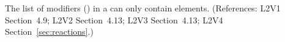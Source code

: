 The list of modifiers () in a \Reaction can only
contain  elements.  (References: L2V1
Section~4.9; L2V2 Section~4.13; L2V3 Section~4.13; L2V4 Section~\ref{sec:reactions}.)
